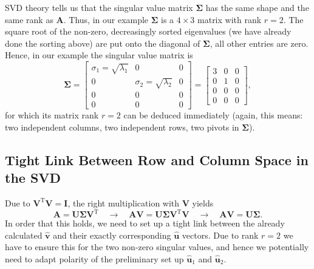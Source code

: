 \documentclass[a4paper, 11pt]{scrartcl}
\begin{document}
SVD theory tells us that the singular value matrix $\bm{\Sigma}$ has the same shape and the same rank as $\bm{A}$. Thus, in our example $\bm{\Sigma}$ is a $4 \times 3$ matrix with rank $r=2$. The square root of the non-zero, decreasingly sorted eigenvalues (we have already done the sorting above) are put onto the diagonal of $\bm{\Sigma}$, all other entries are zero. Hence, in our example
the singular value matrix is
$$
\bm{\Sigma}=
\begin{bmatrix}
\sigma_1 = \sqrt{\lambda_1} & 0 & 0\\
0 &  \sigma_2 = \sqrt{\lambda_2} & 0\\
0 & 0 & 0\\
0 & 0 & 0
\end{bmatrix}
=
\begin{bmatrix}
3 & 0 & 0\\
0 &  1 & 0\\
0 & 0 & 0\\
0 & 0 & 0
\end{bmatrix},
$$
for which its matrix rank $r=2$ can be deduced immediately (again, this means: two independent columns, two independent rows, two pivots in $\bm{\Sigma}$).

\subsection{Tight Link Between Row and Column Space in the SVD}
Due to $\bm{V}^\mathrm{T} \bm{V} = \bm{I}$, the right multiplication with $\bm{V}$ yields
$$
\bm{A} = \bm{U} \bm{\Sigma} \bm{V}^\mathrm{T}
\quad\rightarrow\quad
\bm{A} \bm{V} = \bm{U} \bm{\Sigma} \bm{V}^\mathrm{T} \bm{V}
\quad\rightarrow\quad
\bm{A} \bm{V} = \bm{U} \bm{\Sigma}.
$$
In order that this holds, we need to set up a tight link between the already calculated $\hat{\bm{v}}$ and their exactly corresponding $\hat{\bm{u}}$ vectors. Due to rank $r=2$ we have to ensure this for the two non-zero singular values, and hence we potentially need to adapt polarity of the preliminary set up $\hat{\bm{u}}_1$ and $\hat{\bm{u}}_2$.
\end{document}
